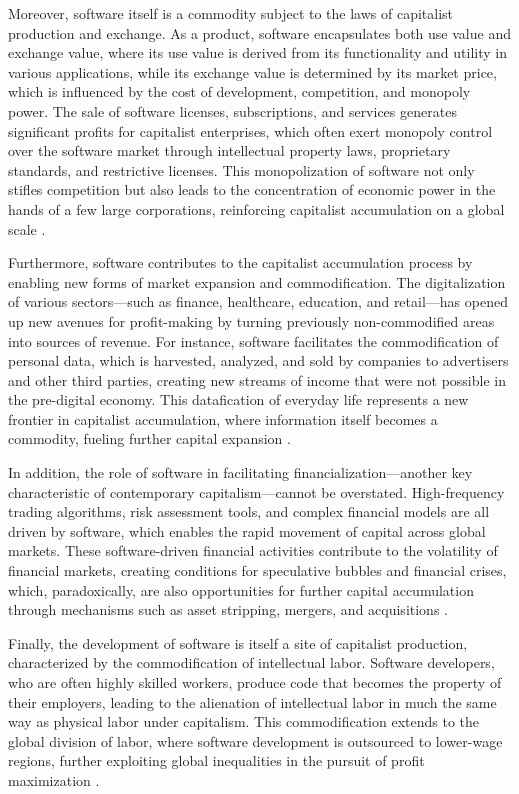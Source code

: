 \begin{refsection}
Moreover, software itself is a commodity subject to the laws of capitalist production and exchange. As a product, software encapsulates both use value and exchange value, where its use value is derived from its functionality and utility in various applications, while its exchange value is determined by its market price, which is influenced by the cost of development, competition, and monopoly power. The sale of software licenses, subscriptions, and services generates significant profits for capitalist enterprises, which often exert monopoly control over the software market through intellectual property laws, proprietary standards, and restrictive licenses. This monopolization of software not only stifles competition but also leads to the concentration of economic power in the hands of a few large corporations, reinforcing capitalist accumulation on a global scale \cite[pp.~210-215]{benkler2010}.

Furthermore, software contributes to the capitalist accumulation process by enabling new forms of market expansion and commodification. The digitalization of various sectors—such as finance, healthcare, education, and retail—has opened up new avenues for profit-making by turning previously non-commodified areas into sources of revenue. For instance, software facilitates the commodification of personal data, which is harvested, analyzed, and sold by companies to advertisers and other third parties, creating new streams of income that were not possible in the pre-digital economy. This datafication of everyday life represents a new frontier in capitalist accumulation, where information itself becomes a commodity, fueling further capital expansion \cite[pp.~98-102]{zuboff2019}.

In addition, the role of software in facilitating financialization—another key characteristic of contemporary capitalism—cannot be overstated. High-frequency trading algorithms, risk assessment tools, and complex financial models are all driven by software, which enables the rapid movement of capital across global markets. These software-driven financial activities contribute to the volatility of financial markets, creating conditions for speculative bubbles and financial crises, which, paradoxically, are also opportunities for further capital accumulation through mechanisms such as asset stripping, mergers, and acquisitions \cite[pp.~143-149]{caffentzis2013}.

Finally, the development of software is itself a site of capitalist production, characterized by the commodification of intellectual labor. Software developers, who are often highly skilled workers, produce code that becomes the property of their employers, leading to the alienation of intellectual labor in much the same way as physical labor under capitalism. This commodification extends to the global division of labor, where software development is outsourced to lower-wage regions, further exploiting global inequalities in the pursuit of profit maximization \cite[pp.~130-135]{schiller1999}.


\end{refsection}
